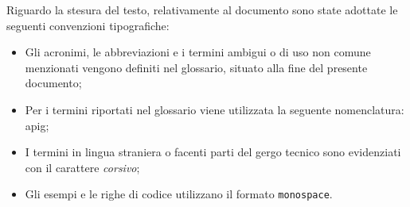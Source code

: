 \noindent Riguardo la stesura del testo, relativamente al documento sono state adottate le seguenti convenzioni tipografiche:
\begin{itemize}
	\item Gli acronimi, le abbreviazioni e i termini ambigui o di uso non comune menzionati vengono definiti nel glossario, situato alla fine del presente documento;
	\item Per i termini riportati nel glossario viene utilizzata la seguente nomenclatura: \gls{apig};
	\item I termini in lingua straniera o facenti parti del gergo tecnico sono evidenziati con il carattere \textit{corsivo};
	\item Gli esempi e le righe di codice utilizzano il formato \texttt{monospace}.
\end{itemize}

\newpage

